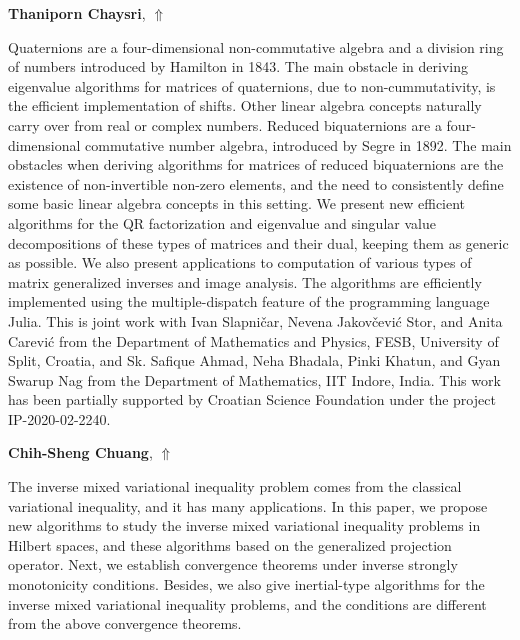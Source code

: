 \documentclass[ILAS2025-program.tex]{subfiles}
\begin{document}
\hypertarget{down0101}{}\begin{ilasabstract}
    
\textbf{Thaniporn Chaysri},  \hfill \hyperlink{up0101}{$\Uparrow$}
    
    
\mtskip
    Quaternions are a four-dimensional non-commutative algebra and a division ring of numbers introduced by Hamilton in 1843. The main obstacle in deriving eigenvalue algorithms for matrices of quaternions, due to non-cummutativity, is the efficient implementation of shifts. Other linear algebra concepts naturally carry over from real or complex numbers. 
Reduced biquaternions are a four-dimensional commutative number algebra, introduced by Segre in 1892. The main obstacles when deriving algorithms for matrices of reduced biquaternions are the existence of non-invertible non-zero elements, and the need to consistently define some basic linear algebra concepts in this setting. 
We present new efficient algorithms for the QR factorization and eigenvalue and singular value decompositions of these types of matrices and their dual, keeping them as generic as possible. 
We also present applications to computation of various types of matrix generalized inverses and image analysis. The algorithms are efficiently implemented using the multiple-dispatch feature of the programming language Julia. 
This is joint work with Ivan Slapni{\v c}ar, Nevena Jakov{\v c}evi{\' c} Stor, and Anita Carevi{\' c} from the Department of Mathematics and Physics, FESB, University of Split, Croatia, and Sk. Safique Ahmad, Neha Bhadala, Pinki Khatun, and Gyan Swarup Nag from the Department of Mathematics, IIT Indore, India.
This work has been partially supported by Croatian Science Foundation under the project IP-2020-02-2240.

\end{ilasabstract}
    

\hypertarget{down0078}{}\begin{ilasabstract}
    
\textbf{Chih-Sheng Chuang},  \hfill \hyperlink{up0078}{$\Uparrow$}
    
    
\mtskip
    The inverse mixed variational inequality problem comes from the classical variational inequality, and it has many
applications. In this paper, we propose new algorithms to study the inverse mixed variational inequality problems in Hilbert spaces, and these algorithms based on the generalized projection operator. Next, we establish convergence theorems under inverse strongly monotonicity conditions. Besides, we also give inertial-type algorithms for the inverse mixed variational inequality problems, and the conditions are different from the above convergence theorems. 

\end{ilasabstract}
    
\end{document}
